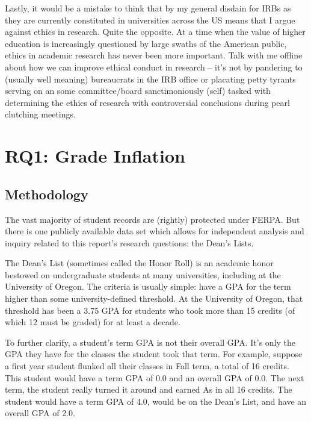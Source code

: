 \documentclass[10]{article}
\begin{document}
Lastly, it would be a mistake to think that by my general disdain for IRBs as they are currently constituted in universities across the US means that I argue against ethics in research. Quite the opposite. At a time when the value of higher education is increasingly questioned by large swaths of the American public, ethics in academic research has never been more important. Talk with me offline about how we can improve ethical conduct in research -- it's not by pandering to (usually well meaning) bureaucrats in the IRB office or placating petty tyrants serving on an some committee/board sanctimoniously (self) tasked with determining the ethics of research with controversial conclusions during pearl clutching meetings.%

\section{RQ1: Grade Inflation}

\subsection{Methodology}
\label{sec:rq1-methodology}

The vast majority of student records are (rightly) protected under FERPA. But there is one publicly available data set which allows for independent analysis and inquiry related to this report's research questions: the Dean's Lists.

The Dean's List (sometimes called the Honor Roll) is an academic honor bestowed on undergraduate students at many universities, including at the University of Oregon. The criteria is usually simple: have a GPA for the term higher than some university-defined threshold. At the University of Oregon, that threshold has been a 3.75 GPA for students who took more than 15 credits (of which 12 must be graded) for at least a decade.

To further clarify, a student's term GPA is not their overall GPA. It's only the GPA they have for the classes the student took that term. For example, suppose a first year student flunked all their classes in Fall term, a total of 16 credits. This student would have a term GPA of 0.0 and an overall GPA of 0.0. The next term, the student really turned it around and earned As in all 16 credits. The student would have a term GPA of 4.0, would be on the Dean's List, and have an overall GPA of 2.0.
\end{document}
